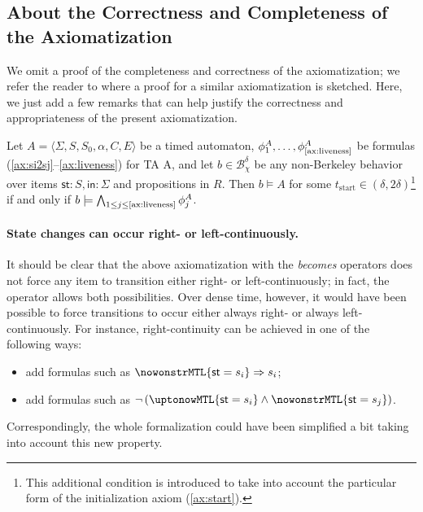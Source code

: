 \documentclass[a4paper]{article}
\newcommand{\tstart}{t_{\mathrm{start}}}
\newcommand{\frf}[1]{(\ref{#1})}
\newcommand{\fsrf}[2]{(\ref{#1}--\ref{#2})}
\newcommand{\Bchi}{\mathcal{B}_{\chi}}
\newcommand{\st}{\mathsf{st}}
\newcommand{\inpt}{\mathsf{in}}
\theoremstyle{plain}
\theoremstyle{definition}
\begin{document}
 \subsection{About the Correctness and Completeness of the Axiomatization}
 We omit a proof of the completeness and correctness of the axiomatization; we refer the reader to \cite[App.~D.6]{Fur07} where a proof for a similar axiomatization is sketched.
Here, we just add a few remarks that can help justify the correctness and appropriateness of the present axiomatization.

\begin{proposition}
Let $A = \langle \Sigma, S, S_0, \alpha, C, E \rangle$ be a timed automaton, $\phi_1^A, \ldots, \phi_{\textup{\ref{ax:liveness}}}^A$ be formulas \fsrf{ax:si2sj}{ax:liveness} for TA A, and let $b \in \Bchi^\delta$ be any non-Berkeley behavior over items $\st: S, \inpt: \Sigma$ and propositions in $R$.
Then $b \models A$ for some $\tstart\in(\delta, 2\delta)$\footnote{This additional condition is introduced to take into account the particular form of the initialization axiom \frf{ax:start}.} if and only if $b \models \bigwedge_{1 \leq j \leq \textup{\ref{ax:liveness}}} \phi_j^A$.
\end{proposition}





\paragraph{State changes can occur right- or left-continuously.}
It should be clear that the above axiomatization with the \emph{becomes} operators does not force any item to transition either right- or left-continuously; in fact, the operator allows both possibilities.
Over dense time, however, it would have been possible to force transitions to occur either always right- or always left-continuously.
For instance, right-continuity can be achieved in one of the following ways:
\begin{itemize}
  \item add formulas such as $\nowonstrMTL{\st = s_i} \Rightarrow s_i$;
  \item add formulas such as $\neg \left( \uptonowMTL{\st = s_i} \wedge \nowonstrMTL{\st = s_j} \right)$.
\end{itemize}
Correspondingly, the whole formalization could have been simplified a bit taking into account this new property.
\end{document}
